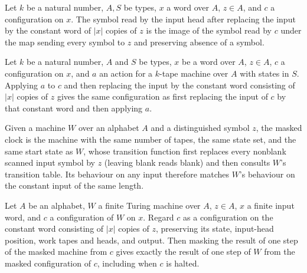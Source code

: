 \begin{lemma}
\label{Complexity.maskedCfg_input}
\leanok
{}
Let $k$ be a natural number, $A,S$ be types, $x$ a word over $A$, $z\in A$, and $c$ a
configuration on $x$. The symbol read by the input head after replacing the input by the
constant word of $|x|$ copies of $z$ is the image of the symbol read by $c$ under the
map sending every symbol to $z$ and preserving absence of a symbol.
\end{lemma}

\begin{lemma}
\label{Complexity.maskedCfg_apply}
\leanok
{}
Let $k$ be a natural number, $A$ and $S$ be types, $x$ be a word over $A$, $z\in A$, $c$
a configuration on $x$, and $a$ an action for a $k$-tape machine over $A$ with states in
$S$. Applying $a$ to $c$ and then replacing the input by the constant word consisting of
$|x|$ copies of $z$ gives the same configuration as first replacing the input of $c$ by
that constant word and then applying $a$.
\end{lemma}

\begin{definition}
\label{Complexity.maskedClock}
\leanok
{}
Given a machine $W$ over an alphabet $A$ and a distinguished symbol $z$, the masked
clock is the machine with the same number of tapes, the same state set, and the same
start state as $W$, whose transition function first replaces every nonblank scanned
input symbol by $z$ (leaving blank reads blank) and then consults $W$'s transition
table. Its behaviour on any input therefore matches $W$'s behaviour on the constant
input of the same length.
\end{definition}

\begin{lemma}
\label{Complexity.maskedClock_step}
\leanok
{}
Let $A$ be an alphabet, $W$ a finite Turing machine over $A$, $z\in A$, $x$ a finite
input word, and $c$ a configuration of $W$ on $x$. Regard $c$ as a configuration on the
constant word consisting of $|x|$ copies of $z$, preserving its state, input-head
position, work tapes and heads, and output. Then masking the result of one step of the
masked machine from $c$ gives exactly the result of one step of $W$ from the masked
configuration of $c$, including when $c$ is halted.
\end{lemma}

